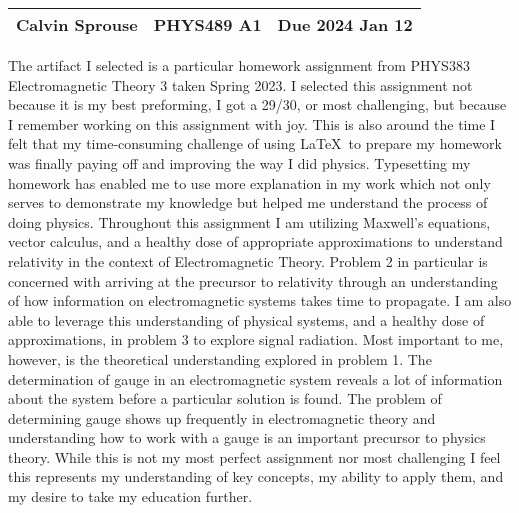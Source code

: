 \documentclass[a4paper, 12pt]{config/homework}
\begin{document}
\noindent
\begin{tabularx}{\textwidth}{>{\centering\arraybackslash}X>{\centering\arraybackslash}X>{\centering\arraybackslash}X}
Calvin Sprouse & PHYS489 A1 & Due 2024 Jan 12\\
\midrule
\end{tabularx}


The artifact I selected is a particular homework assignment from PHYS383 Electromagnetic Theory 3 taken Spring 2023. I selected this assignment not because it is my best preforming, I got a 29/30, or most challenging, but because I remember working on this assignment with joy. This is also around the time I felt that my time-consuming challenge of using \LaTeX\ to prepare my homework was finally paying off and improving the way I did physics. Typesetting my homework has enabled me to use more explanation in my work which not only serves to demonstrate my knowledge but helped me understand the process of doing physics. Throughout this assignment I am utilizing Maxwell's equations, vector calculus, and a healthy dose of appropriate approximations to understand relativity in the context of Electromagnetic Theory. Problem 2 in particular is concerned with arriving at the precursor to relativity through an understanding of how information on electromagnetic systems takes time to propagate. I am also able to leverage this understanding of physical systems, and a healthy dose of approximations, in problem 3 to explore signal radiation. Most important to me, however, is the theoretical understanding explored in problem 1. The determination of gauge in an electromagnetic system reveals a lot of information about the system before a particular solution is found. The problem of determining gauge shows up frequently in electromagnetic theory and understanding how to work with a gauge is an important precursor to physics theory. While this is not my most perfect assignment nor most challenging I feel this represents my understanding of key concepts, my ability to apply them, and my desire to take my education further.


\end{document}
